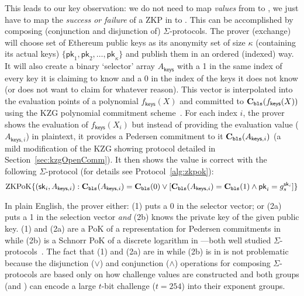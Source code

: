 This leads to our key observation: we do not need to map \textit{values} from \secp to \bls, we just have to map the \textit{success or failure} of a ZKP in \secp to \bls. This can be accomplished by composing (conjunction and disjunction of) $\Sigma$-protocols. The prover (exchange) will choose set of Ethereum public keys as its anonymity set of size $\kappa$ (containing its actual keys) $\{\mathsf{pk}_1,\mathsf{pk}_2,\dots,\mathsf{pk}_\kappa\}$ and publish them in an ordered (indexed) way. It will also create a binary `selector' array $A_\mathsf{keys}$ with a 1 in the same index of every key it is claiming to know and a 0 in the index of the keys it does not know (or does not want to claim for whatever reason). This vector is interpolated into the evaluation points of a polynomial $f_\mathsf{keys}(X)$  and committed to $\textbf{C}_\texttt{bls}(f_\mathsf{keys}(X))$ using the KZG polynomial commitment scheme~\cite{kzg}. For each index $i$, the prover shows the evaluation of $f_\mathsf{keys}(X_i)$ but instead of providing the evaluation value ($A_{\mathsf{keys},i}$) in plaintext, it provides a Pedersen commitment to it $\textbf{C}_\texttt{bls}(A_{\mathsf{keys},i})$ (a mild modification of the KZG showing protocol detailed in Section~\ref{sec:kzgOpenComm}). It then shows the value is correct with the following $\Sigma$-protocol (for details see Protocol~\ref{alg:zkpok}):
\[ \mathrm{ZKPoK} \{ (\mathsf{sk}_i,A_{\mathsf{keys},i}) : \textbf{C}_\texttt{bls}(A_{\mathsf{keys},i})=\textbf{C}_\texttt{bls}(0) \lor [\textbf{C}_\texttt{bls}(A_{\mathsf{keys},i})=\textbf{C}_\texttt{bls}(1) \land \mathsf{pk}_i=g_s^{\mathsf{sk}_i} ] \} \]

In plain English, the prover either: (1) puts a 0 in the selector vector; or (2a) puts a 1 in the selection vector \textit{and} (2b) knows the private key of the given public key. (1) and (2a) are a PoK of a representation for Pedersen commitments in \bls while (2b) is a Schnorr PoK of a discrete logarithm in \secp---both well studied $\Sigma$-protocols~\cite{damgard10,sigma}. The fact that (1) and (2a) are in \bls while (2b) is in \secp is not problematic because the disjunction ($\lor$) and conjunction ($\land$) operations for composing $\Sigma$-protocols are based only on how challenge values are constructed and both groups (\secp and \bls) can encode a large $t$-bit challenge (\eg $t=254$) into their exponent groups. 

\FloatBarrier

\FloatBarrier

